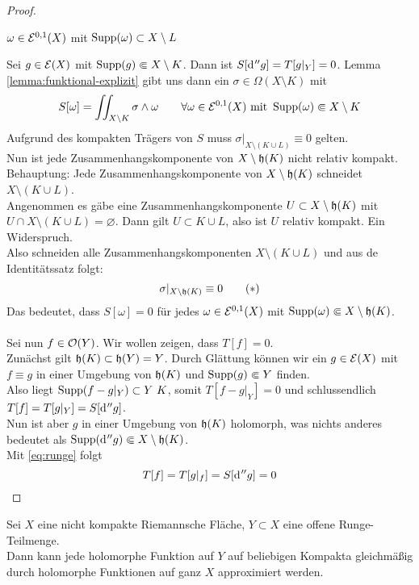 \begin{proof}
\begin{itemize}
    $\omega \in \mathcal{E}^{0,1}(X)$ mit $\operatorname{Supp}(\omega) \subset X\setminus L$
  \end{itemize}
   Sei $g \in \mathcal{E}(X)$ mit $\operatorname{Supp}(g) \Subset X \setminus K$. Dann ist
   $S[\d[''g]] = T[g|_Y]  = 0$. Lemma \ref{lemma:funktional-explizit}
   gibt uns dann ein $\sigma \in \Omega(X\setminus K)$ mit
   \[
   S[\omega] = \iint_{X \setminus K}\sigma \wedge \omega \qquad
   \forall \omega \in \mathcal{E}^{0,1}(X) \text{ mit } \operatorname{Supp}(\omega)
   \Subset X\setminus K
   \]
   Aufgrund des kompakten Trägers von $S$ muss $\sigma|_{X \setminus
     (K \cup L)} \equiv 0$ gelten. \\
   Nun ist jede Zusammenhangskomponente von $X \setminus \mathfrak{h}(K)$
   nicht relativ kompakt. \\
   Behauptung: Jede Zusammenhangskomponente von $X \setminus
   \mathfrak{h}(K)$ schneidet $X \setminus (K \cup L)$. \\
   Angenommen es gäbe eine Zusammenhangskomponente $U \subset X
   \setminus \mathfrak{h}(K)$ mit $U \cap X \setminus ( K \cup L) =
   \varnothing$. Dann gilt $U \subset K \cup L$, also ist $U$ relativ
   kompakt. Ein Widerspruch. \\
   Also schneiden alle Zusammenhangskomponenten $X \setminus (K \cup
   L)$ und aus de Identitätssatz folgt:
   \[
   \sigma|_{X \setminus \mathfrak{h}(K)} \equiv 0 \label{eq:runge}\tag{$\ast$}
   \]
   Das bedeutet, dass $S[\omega] = 0$ für jedes $\omega \in
   \mathcal{E}^{0,1}(X)$ mit $\operatorname{Supp}(\omega) \Subset X \setminus
   \mathfrak{h}(K)$.\\
   \\
   Sei nun $f \in \mathcal{O}(Y)$. Wir wollen zeigen, dass $T[f] = 0$. \\
   Zunächst gilt $\mathfrak{h}(K) \subset \mathfrak{h}(Y) = Y$. Durch Glättung
   können wir ein $g \in \mathcal{E}(X)$ mit $f \equiv g$ in einer Umgebung
   von $\mathfrak{h}(K)$ und $\operatorname{Supp}(g) \Subset Y$ finden. \\
   Also liegt $\Supp(f - g|_Y) \subset Y \ K$, somit $T[f- g|_Y] = 0$
   und schlussendlich $T[f] = T[g|_Y] = S[\d[''g]]$. \\
   Nun ist aber $g$ in einer Umgebung von $\mathfrak{h}(K)$ holomorph, was
   nichts anderes bedeutet als $\Supp(\d[''g]) \Subset X \setminus
   \runge(K)$. \\
   Mit \eqref{eq:runge} folgt
   \[
   T[f] = T[g|_f] = S[\d[''g]] = 0
   \]
\end{proof}

\begin{thm}
  Sei $X$ eine nicht kompakte Riemannsche Fläche, $Y \subset X$ eine
  offene Runge-Teilmenge. \\
  Dann kann jede holomorphe Funktion auf $Y$ auf beliebigen Kompakta
  gleichmäßig durch holomorphe Funktionen auf ganz $X$ approximiert werden.
\end{thm}

